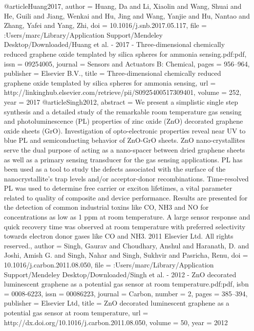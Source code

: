@article{Huang2017,
author = {Huang, Da and Li, Xiaolin and Wang, Shuai and He, Guili and Jiang, Wenkai and Hu, Jing and Wang, Yanjie and Hu, Nantao and Zhang, Yafei and Yang, Zhi},
doi = {10.1016/j.snb.2017.05.117},
file = {:Users/marc/Library/Application Support/Mendeley Desktop/Downloaded/Huang et al. - 2017 - Three-dimensional chemically reduced graphene oxide templated by silica spheres for ammonia sensing.pdf:pdf},
issn = {09254005},
journal = {Sensors and Actuators B: Chemical},
pages = {956--964},
publisher = {Elsevier B.V.},
title = {{Three-dimensional chemically reduced graphene oxide templated by silica spheres for ammonia sensing}},
url = {http://linkinghub.elsevier.com/retrieve/pii/S0925400517309401},
volume = {252},
year = {2017}
}
@article{Singh2012,
abstract = {We present a simplistic single step synthesis and a detailed study of the remarkable room temperature gas sensing and photoluminescence (PL) properties of zinc oxide (ZnO) decorated graphene oxide sheets (GrO). Investigation of opto-electronic properties reveal near UV to blue PL and semiconducting behavior of ZnO-GrO sheets. ZnO nano-crystallites serve the dual purpose of acting as a nano-spacer between dried graphene sheets as well as a primary sensing transducer for the gas sensing applications. PL has been used as a tool to study the defects associated with the surface of the nanocrystallite's trap levels and/or acceptor-donor recombinations. Time-resolved PL was used to determine free carrier or exciton lifetimes, a vital parameter related to quality of composite and device performance. Results are presented for the detection of common industrial toxins like CO, NH3 and NO for concentrations as low as 1 ppm at room temperature. A large sensor response and quick recovery time was observed at room temperature with preferred selectivity towards electron donor gases like CO and NH3. {\textcopyright} 2011 Elsevier Ltd. All rights reserved.},
author = {Singh, Gaurav and Choudhary, Anshul and Haranath, D. and Joshi, Amish G. and Singh, Nahar and Singh, Sukhvir and Pasricha, Renu},
doi = {10.1016/j.carbon.2011.08.050},
file = {:Users/marc/Library/Application Support/Mendeley Desktop/Downloaded/Singh et al. - 2012 - ZnO decorated luminescent graphene as a potential gas sensor at room temperature.pdf:pdf},
isbn = {0008-6223},
issn = {00086223},
journal = {Carbon},
number = {2},
pages = {385--394},
publisher = {Elsevier Ltd},
title = {{ZnO decorated luminescent graphene as a potential gas sensor at room temperature}},
url = {http://dx.doi.org/10.1016/j.carbon.2011.08.050},
volume = {50},
year = {2012}
}
